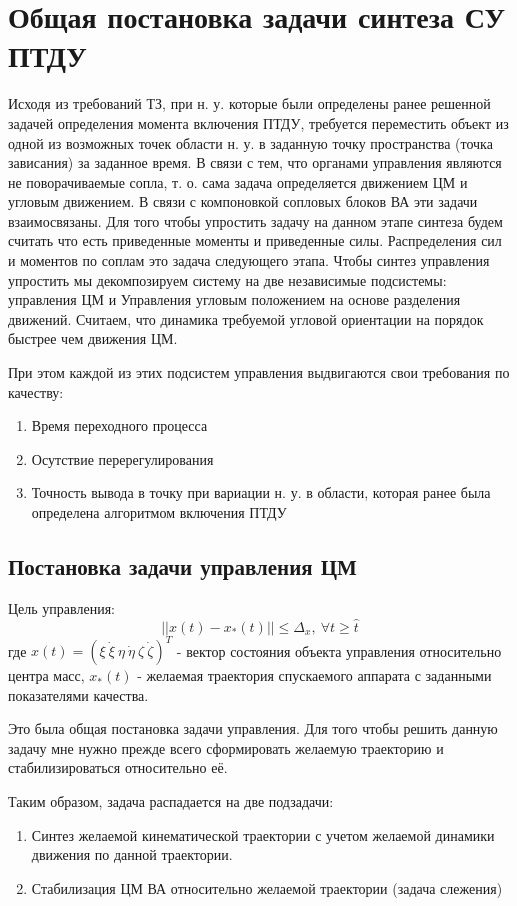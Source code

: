\section{Общая постановка задачи синтеза СУ ПТДУ}
Исходя из требований ТЗ, при н. у. которые были определены ранее решенной задачей определения момента включения ПТДУ, требуется переместить объект из одной из возможных точек области н. у. в заданную точку пространства (точка зависания) за заданное время. В связи с тем, что органами управления являются не поворачиваемые сопла, т. о. сама задача определяется движением ЦМ и угловым движением. В связи с компоновкой сопловых блоков ВА эти задачи взаимосвязаны. Для того чтобы упростить задачу на данном этапе синтеза будем считать что есть приведенные моменты и приведенные силы. Распределения сил и моментов по соплам это задача следующего этапа. Чтобы синтез управления упростить мы декомпозируем систему на две независимые подсистемы: управления ЦМ и Управления угловым положением на основе разделения движений. Считаем, что динамика требуемой угловой ориентации на порядок быстрее чем движения ЦМ.

При этом каждой из этих подсистем управления выдвигаются свои требования по качеству:
\begin{enumerate}
	\item Время переходного процесса
	\item Осутствие перерегулирования
	\item Точность вывода в точку при вариации н. у. в области, которая ранее была определена алгоритмом включения ПТДУ
\end{enumerate}
\newpage

\subsection{Постановка задачи управления ЦМ}

Цель управления: 
\begin{equation}
|| x(t) - x_{*}(t) || \leq \Delta_x, \  \forall t \geq \hat{t}
\label{eq:ur_target_control}
\end{equation}
где $x(t) = (\xi \ \dot{\xi} \ \eta\  \dot{\eta} \ \zeta \ \dot{\zeta})^T$ - вектор состояния объекта управления относительно центра масс, $x_{*}(t)$ - желаемая траектория спускаемого аппарата с заданными показателями качества.

Это была общая постановка задачи управления. Для того чтобы решить данную задачу мне нужно прежде всего сформировать желаемую траекторию и стабилизироваться относительно 
её.

Таким образом, задача распадается на две подзадачи:
\begin{enumerate}
	\item Синтез желаемой кинематической траектории с учетом желаемой динамики движения по данной траектории.
	\item Стабилизация ЦМ ВА относительно желаемой траектории (задача слежения)
\end{enumerate}
\clearpage